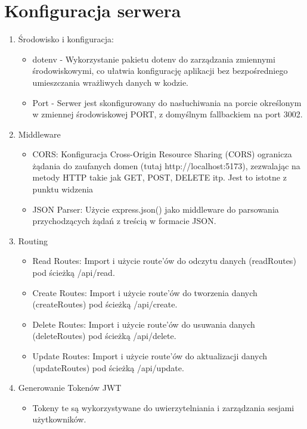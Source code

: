 \section{Konfiguracja serwera}
\begin{enumerate}
    \item Środowisko i konfiguracja:
        \begin{itemize}
            \item dotenv - Wykorzystanie pakietu dotenv do zarządzania 
            zmiennymi środowiskowymi, co ułatwia konfigurację aplikacji bez bezpośredniego umieszczania wrażliwych danych w kodzie.
            \item Port - Serwer jest skonfigurowany do nasłuchiwania na porcie określonym w zmiennej środowiskowej PORT, z domyślnym fallbackiem na port 3002.
        \end{itemize}
    \item Middleware
        \begin{itemize}
            \item CORS: Konfiguracja Cross-Origin Resource Sharing (CORS) ogranicza żądania do zaufanych domen (tutaj http://localhost:5173), zezwalając na metody HTTP takie jak GET, POST, DELETE itp. Jest to istotne z punktu widzenia 
            \item JSON Parser: Użycie express.json() jako middleware do parsowania przychodzących żądań z treścią w formacie JSON.
        \end{itemize}
    \item Routing
        \begin{itemize}
            \item Read Routes: Import i użycie route'ów do odczytu danych (readRoutes) pod ścieżką /api/read.
            \item Create Routes: Import i użycie route'ów do tworzenia danych (createRoutes) pod ścieżką /api/create.
            \item Delete Routes: Import i użycie route'ów do usuwania danych (deleteRoutes) pod ścieżką /api/delete.
            \item Update Routes: Import i użycie route'ów do aktualizacji danych (updateRoutes) pod ścieżką /api/update.
        \end{itemize}
    \item Generowanie Tokenów JWT
        \begin{itemize}
            \item Tokeny te są wykorzystywane do uwierzytelniania i zarządzania sesjami użytkowników.

\end{itemize}
\end{enumerate}
